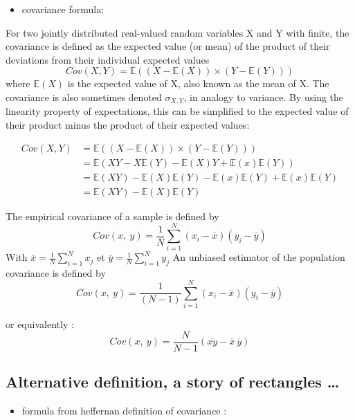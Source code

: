 \documentclass[
]{report}
\providecommand{\tightlist}{%
  \setlength{\itemsep}{0pt}\setlength{\parskip}{0pt}}
\begin{document}
\begin{itemize}
\tightlist
\item
  covariance formula:
\end{itemize}

For two jointly distributed real-valued random variables X and Y with finite, the covariance is defined as the expected value (or mean) of the product of their deviations from their individual expected values
\[Cov(X,Y)=\mathbb{E}((X-\mathbb{E}(X))\times(Y-\mathbb{E}(Y)))\]
where \(\mathbb{E}(X)\) is the expected value of X, also known as the mean of X. The covariance is also sometimes denoted \(\sigma_{X,Y}\), in analogy to variance. By using the linearity property of expectations, this can be simplified to the expected value of their product minus the product of their expected values:

\begin{align}
  Cov(X,Y) &=\mathbb{E}((X-\mathbb{E}(X))\times(Y-\mathbb{E}(Y))) \\
  &=\mathbb{E}(XY- X\mathbb{E}(Y) - \mathbb{E}(X)Y + \mathbb{E}(x)\mathbb{E}(Y)) \\
  &= \mathbb{E}(XY) - \mathbb{E}(X)\mathbb{E}(Y) - \mathbb{E}(x)\mathbb{E}(Y) + \mathbb{E}(x)\mathbb{E}(Y) \\
  &= \mathbb{E}(XY)-\mathbb{E}(X)\mathbb{E}(Y)
\end{align}

The empirical covariance of a sample is defined by
\[Cov(x,~y)=\frac{1}{N}
\sum_{i=1}^{N} (x_i-\overline{x})(y_i -\overline{y})\]
With
\(\overline{x}=\frac{1}{N}\sum_{i=1}^{N} x_j\) et \(\overline{y}=\frac{1}{N}\sum_{i=1}^{N} y_j\)
An unbiased estimator of the population covariance is defined by
\[Cov(x,~y)=\frac{1}{(N-1)}
\sum_{i=1}^{N} (x_i-\overline{x})(y_i -\overline{y})\]

or equivalently :
\[Cov(x,~y)=\frac{N}{N-1}(\overline{xy}-\overline{x}~\overline{y})\]

\hypertarget{alternative-definition-a-story-of-rectangles}{%
\subsection{Alternative definition, a story of rectangles \ldots{}}\label{alternative-definition-a-story-of-rectangles}}

\begin{itemize}
\tightlist
\item
  formula from heffernan definition of covariance :
\end{itemize}
\end{document}

